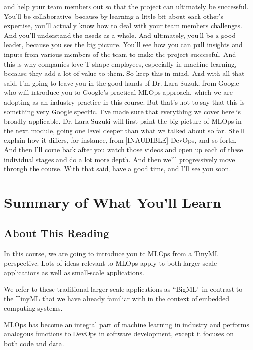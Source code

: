 and help your team members out so that the project can ultimately
be successful.
You'll be collaborative, because by learning a little bit
about each other's expertise, you'll actually
know how to deal with your team members challenges.
And you'll understand the needs as a whole.
And ultimately, you'll be a good leader, because you see the big picture.
You'll see how you can pull insights and inputs from various members of the team
to make the project successful.
And this is why companies love T-shape employees, especially
in machine learning, because they add a lot of value to them.
So keep this in mind.
And with all that said, I'm going to leave you
in the good hands of Dr. Lara Suzuki from Google
who will introduce you to Google's practical MLOps
approach, which we are adopting as an industry practice in this course.
But that's not to say that this is something very Google specific.
I've made sure that everything we cover here is broadly applicable.
Dr. Lara Suzuki will first paint the big picture of MLOps in the next module,
going one level deeper than what we talked about so far.
She'll explain how it differs, for instance, from [INAUDIBLE] DevOps,
and so forth.
And then I'll come back after you watch those videos
and open up each of these individual stages and do a lot more depth.
And then we'll progressively move through the course.
With that said, have a good time, and I'll see you soon.

\section{Summary of What You’ll Learn}

\subsection{About This Reading}

In this course, we are going to introduce you to MLOps from a TinyML perspective. Lots of ideas relevant to MLOps apply to both larger-scale applications as well as small-scale applications.

We refer to these traditional larger-scale applications as “BigML” in contrast to the TinyML that we have already familiar with in the context of embedded computing systems.

MLOps has become an integral part of machine learning in industry and performs analogous functions to DevOps in software development, except it focuses on both code and data.



